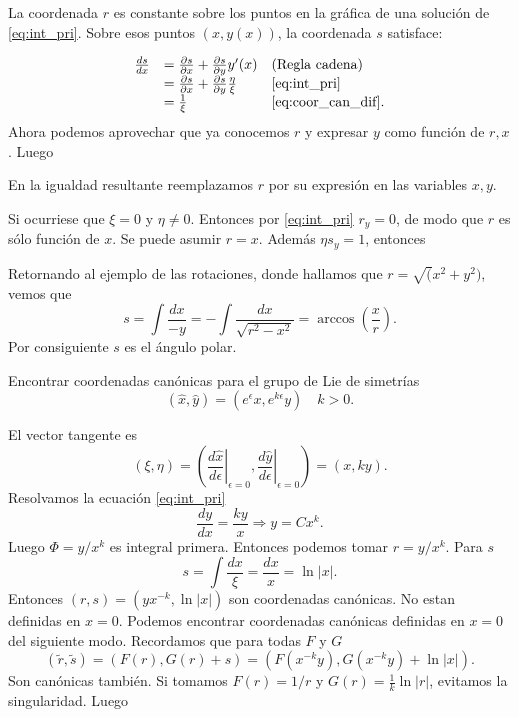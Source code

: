 La coordenada $r$ es constante sobre los puntos en la gráfica de una solución de \eqref{eq:int_pri}. Sobre esos puntos $(x,y(x))$, la coordenada $s$ satisface:

\begin{equation} \label{eq:coor_can_s}
\begin{array}{lll}
\frac{ds}{dx}&=\frac{\partial s}{\partial x}+\frac{\partial s}{\partial y} y'(x) & \hbox{(Regla cadena)}\\
&=\frac{\partial s}{\partial x}+\frac{\partial s}{\partial y} \frac{\eta}{\xi} &
  \eqref{eq:int_pri}\\
&=\frac{1}{\xi} &\hbox{\eqref{eq:coor_can_dif}}.
\end{array}
\end{equation}
Ahora podemos aprovechar que ya conocemos $r$ y  expresar $y$ como función de $r,x$. Luego

\begin{teorema}{}
\end{teorema}
 

En la igualdad resultante  reemplazamos $r$ por su expresión en las variables $x,y$.


Si ocurriese que $\xi=0$ y $\eta\neq 0$. Entonces por \eqref{eq:int_pri} $r_y=0$, de modo que $r$ es sólo función de $x$. Se puede asumir $r=x$. Además $\eta s_y=1$, entonces


\begin{ejemplo}{} Retornando al ejemplo de las rotaciones, donde hallamos que $r=\sqrt(x^2+y^2)$, vemos que
\[s=\int\frac{dx}{-y}=-\int\frac{dx}{\sqrt{r^2-x^2}}=\arccos\left(\frac{x}{r}\right).\]
Por consiguiente  $s$ es el ángulo polar.
\end{ejemplo}


\label{pag_ejem_canon1}
\begin{ejemplo}{} Encontrar coordenadas canónicas para el grupo de Lie de simetrías
\[(\hat{x},\hat{y})=(e^{\epsilon}x,e^{k\epsilon}y)\quad k>0.\]
\end{ejemplo}
El vector tangente es
\[(\xi,\eta)=\left(\left.\frac{d\hat{x}}{d\epsilon}\right|_{\epsilon=0},\left.\frac{d\hat{y}}{d\epsilon}\right|_{\epsilon=0}\right)=(x,ky).\]
Resolvamos la ecuación  \eqref{eq:int_pri} 
\[\frac{dy}{dx}=\frac{ky}{x}\Rightarrow y=Cx^k.\]
Luego $\Phi=y/x^k$ es integral primera. Entonces podemos tomar $r=y/x^k$.  Para $s$
\label{pag_ejem_canon2}
\[s=\int\frac{dx}{\xi}=\frac{dx}{x}=\ln|x|.\]
Entonces $(r,s)=(yx^{-k},\ln|x|)$ son coordenadas canónicas. No estan definidas en $x=0$.
Podemos encontrar coordenadas canónicas definidas en $x=0$ del siguiente modo. Recordamos que para todas $F$ y $G$
\[(\tilde{r},\tilde{s})=(F(r),G(r)+s)=(F(x^{-k}y),G(x^{-k}y)+\ln|x|).\]
Son canónicas también. Si tomamos $F(r)=1/r$ y $G(r)=\frac{1}{k}\ln|r|$, evitamos la singularidad. Luego

